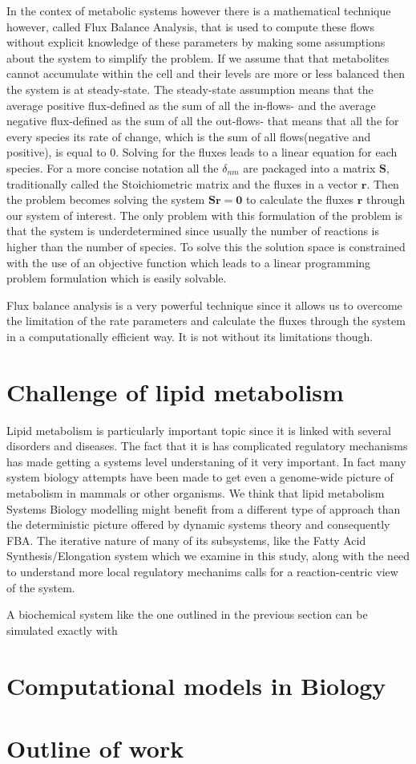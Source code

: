 In the contex of metabolic systems however there is a mathematical technique however, called Flux Balance
Analysis, that is used to compute these flows without explicit
knowledge of these parameters by making some assumptions about the
system to simplify the problem. If we assume that that metabolites
cannot accumulate within the cell and their levels are more or less
balanced then the system is at steady-state. The steady-state assumption means that the average positive flux-defined as the sum of
all the in-flows- and the average negative flux-defined as the sum of
all the out-flows- that means that all the for every species its rate
of change, which is the sum of all flows(negative and
positive), is equal to 0. Solving for the fluxes leads to a linear equation for each
species. For a more concise notation all the $\delta_{nm}$ are
packaged into a matrix $\mathbf{S}$, traditionally called the Stoichiometric
matrix and the fluxes in a vector $\mathbf{r}$. Then the problem
becomes solving the system $\mathbf{Sr} = \mathbf{0}$ to calculate the
fluxes $\mathbf{r}$ through our system of interest. The only problem
with this formulation of the problem is that the system is
underdetermined since usually the number of reactions is higher than
the number of species. To solve this the solution space is constrained
with the use of an objective function which leads to a linear
programming problem formulation which is easily solvable.

Flux balance analysis is a very powerful technique since it allows us
to overcome the limitation of the rate parameters and calculate the
fluxes through the system in a computationally efficient way. It is
not without its limitations though.

\section{Challenge of lipid metabolism}

Lipid metabolism is particularly important topic since it is linked
with several disorders and diseases. The fact that it is has
complicated regulatory mechanisms has made getting a systems level
understaning of it very important. In fact many system biology
attempts have been made to get even a genome-wide picture of metabolism in
mammals or other organisms. We think that lipid metabolism Systems
Biology modelling might benefit from a different type of approach than
the deterministic picture offered by dynamic systems theory and
consequently FBA. The iterative nature of many of its subsystems, like
the Fatty Acid Synthesis/Elongation system which we examine in this
study, along with the need to understand more local regulatory
mechanims calls for a reaction-centric view of the system.

A biochemical system like the one outlined in the previous section can
be simulated exactly with




\section{Computational models in Biology}


\section{Outline of work}
